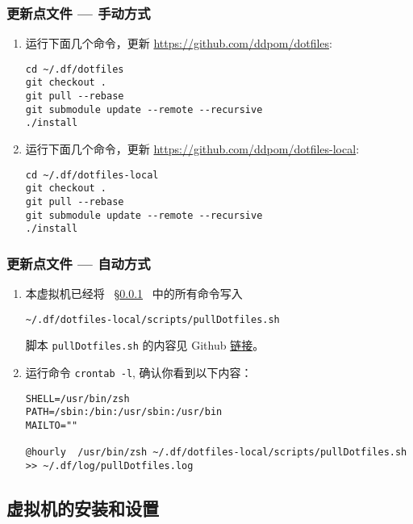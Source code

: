 \documentclass[
    11pt,
    cite=authoryear,
    device=normal,
    lang=cn,
    mode=simple,
    result=answer,
    toc=onecol,
]{elegantbook_sierxue}
\begin{document}
\subsubsection{更新点文件 --- 手动方式}%
\label{ssub:update-dotfiles-manual}

\begin{enumerate}
    \item 运行下面几个命令，更新 \href{https://github.com/ddpom/dotfiles}
        {https://github.com/ddpom/dotfiles}:
\begin{lstlisting}[escapeinside=``]
cd ~/.df/dotfiles
git checkout .
git pull --rebase
git submodule update --remote --recursive
./install
\end{lstlisting}
    \item 运行下面几个命令，更新
        \href{https://github.com/ddpom/dotfiles-local}
        {https://github.com/ddpom/dotfiles-local}:
\begin{lstlisting}[escapeinside=``]
cd ~/.df/dotfiles-local
git checkout .
git pull --rebase
git submodule update --remote --recursive
./install
\end{lstlisting}
\end{enumerate}

\subsubsection{更新点文件 --- 自动方式}%
\label{ssub:update-dotfiles-crontab}

\begin{enumerate}
    \item 本虚拟机已经将 ~\S\ref{ssub:update-dotfiles-manual}~ 中的所有命令写入
\begin{lstlisting}[escapeinside=``]
~/.df/dotfiles-local/scripts/pullDotfiles.sh
\end{lstlisting}
        脚本 \lstinline{pullDotfiles.sh} 的内容见 Github
        \href{https://github.com/ddpom/scripts/blob/master/pullDotfiles.sh}
        {链接}。
    \item 运行命令 \lstinline{crontab -l}, 确认你看到以下内容：
\begin{lstlisting}[escapeinside=``]
SHELL=/usr/bin/zsh
PATH=/sbin:/bin:/usr/sbin:/usr/bin
MAILTO=""

@hourly  /usr/bin/zsh ~/.df/dotfiles-local/scripts/pullDotfiles.sh >> ~/.df/log/pullDotfiles.log
\end{lstlisting}
\end{enumerate}

\subsection{虚拟机的安装和设置}%
\label{sub:vbox-vm-install-set}
\end{document}

